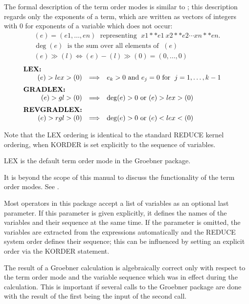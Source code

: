 The formal description of the term order modes is similar to
\cite{Kredel:88}; this description regards only the exponents of a term,
which are written as vectors of integers with $0$ for exponents of a
variable which does not occur:
\[
\begin{array}{l}
  (e) = (e1,\ldots , en) \;\mbox{ representing }\; x1**e1 \ x2**e2 \cdots
  xn**en. \\
  \deg(e) \; \mbox{ is the sum over all elements of } \;(e) \\
  (e) \gg (l) \Longleftrightarrow (e)-(l)\gg (0) = (0,\ldots ,0)
\end{array}
\]
\[
\begin{array}{rll}
\multicolumn{1}{l}{\hspace*{-.5cm}\mbox{\bf LEX:}} \\
  (e) > lex > (0) & \Longrightarrow  & e_k > 0 \mbox{ and } e_j =0
\mbox{ for }\; j=1,\ldots , k-1\vspace*{2mm} \\
\multicolumn{1}{l}{\hspace*{-.5cm}\mbox{\bf
GRADLEX:}} \\
  (e) >gl> (0)  & \Longrightarrow  & \deg(e)>0  \mbox { or } (e) >lex>
(0)\vspace*{2mm} \\
\multicolumn{1}{l}{\hspace*{-.5cm}\mbox{\bf
REVGRADLEX:}}\\
  (e) >rgl> (0) & \Longrightarrow & \deg(e)>0  \mbox{ or }(e)  <lex<
(0)
\end{array}
\]

Note that the LEX ordering is identical to the standard REDUCE
kernel ordering, when KORDER is set explicitly to the sequence of
variables.

LEX is the default term order mode in the Groebner package.

It is beyond the scope of this manual to discuss the functionality of
the term order modes. See \cite{Buchberger:88}.

Most operators in this package accept a list of variables as an
optional last parameter. If this parameter is given explicitly, it
defines the names of the variables and their sequence at the same
time. If the parameter is omitted, the variables are extracted from
the expressions automatically and the REDUCE system order defines
their sequence; this can be influenced by setting an explicit order
via the KORDER statement.

The result of a Groebner calculation is algebraically correct only
with respect to the term order mode and the variable sequence
which was in effect during the calculation. This is important if
several calls to the Groebner package are done with the result of the
first being the input of the second call.

